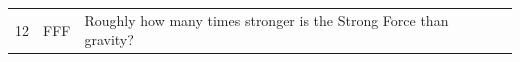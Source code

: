 \documentclass[10pt]{article}
\begin{document}
\begin{tiny}
\begin{longtable}{|r|p{0.375in}|p{1.275in}|p{3.5in}|}
12 &          FFF &                                                                                                                                                                                                                Roughly how many times stronger is the Strong Force than gravity? &                                                                                                                                                                                                                                                                                                                                                                                                                                                                                                                                                                                                                                                                                                                                                                                                                                                                                                                                                                                                                                                                                                                                                                                                                                                                                                                                                                                                                                                                                                                                                                                                                                                                                                                                                                                                                                                                                                                                                                                                                                                                                                                                                                                                                                                                                                                                                                                                                                                                                                                                                                                                                                                                                                                                                                                                                                                                                                                                                                                                                                                                                               
\end{longtable}
\end{tiny}
\end{document}
